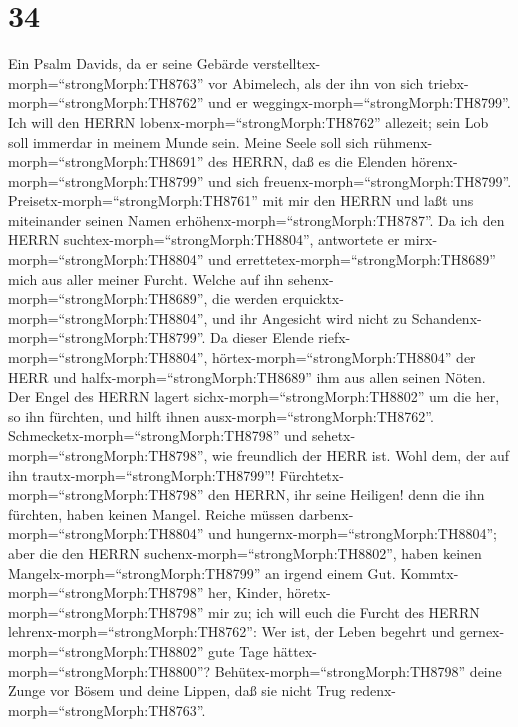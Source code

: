 \hypertarget{section-33}{%
\section{34}\label{section-33}}

 Ein Psalm Davids, da er seine Gebärde
verstelltex-morph=``strongMorph:TH8763'' vor Abimelech, als der ihn von
sich triebx-morph=``strongMorph:TH8762'' und er
weggingx-morph=``strongMorph:TH8799''. Ich will den HERRN
lobenx-morph=``strongMorph:TH8762'' allezeit; sein Lob soll immerdar in
meinem Munde sein.  Meine Seele soll sich
rühmenx-morph=``strongMorph:TH8691'' des HERRN, daß es die Elenden
hörenx-morph=``strongMorph:TH8799'' und sich
freuenx-morph=``strongMorph:TH8799''. 
Preisetx-morph=``strongMorph:TH8761'' mit mir den HERRN und laßt uns
miteinander seinen Namen erhöhenx-morph=``strongMorph:TH8787''.
 Da ich den HERRN suchtex-morph=``strongMorph:TH8804'',
antwortete er mirx-morph=``strongMorph:TH8804'' und
errettetex-morph=``strongMorph:TH8689'' mich aus aller meiner Furcht.
 Welche auf ihn sehenx-morph=``strongMorph:TH8689'', die
werden erquicktx-morph=``strongMorph:TH8804'', und ihr Angesicht wird
nicht zu Schandenx-morph=``strongMorph:TH8799''.  Da dieser
Elende riefx-morph=``strongMorph:TH8804'',
hörtex-morph=``strongMorph:TH8804'' der HERR und
halfx-morph=``strongMorph:TH8689'' ihm aus allen seinen Nöten.
 Der Engel des HERRN lagert
sichx-morph=``strongMorph:TH8802'' um die her, so ihn fürchten, und
hilft ihnen ausx-morph=``strongMorph:TH8762''. 
Schmecketx-morph=``strongMorph:TH8798'' und
sehetx-morph=``strongMorph:TH8798'', wie freundlich der HERR ist. Wohl
dem, der auf ihn trautx-morph=``strongMorph:TH8799''! 
Fürchtetx-morph=``strongMorph:TH8798'' den HERRN, ihr seine Heiligen!
denn die ihn fürchten, haben keinen Mangel.  Reiche müssen
darbenx-morph=``strongMorph:TH8804'' und
hungernx-morph=``strongMorph:TH8804''; aber die den HERRN
suchenx-morph=``strongMorph:TH8802'', haben keinen
Mangelx-morph=``strongMorph:TH8799'' an irgend einem Gut. 
Kommtx-morph=``strongMorph:TH8798'' her, Kinder,
höretx-morph=``strongMorph:TH8798'' mir zu; ich will euch die Furcht des
HERRN lehrenx-morph=``strongMorph:TH8762'':  Wer ist, der
Leben begehrt und gernex-morph=``strongMorph:TH8802'' gute Tage
hättex-morph=``strongMorph:TH8800''? 
Behütex-morph=``strongMorph:TH8798'' deine Zunge vor Bösem und deine
Lippen, daß sie nicht Trug redenx-morph=``strongMorph:TH8763''.

